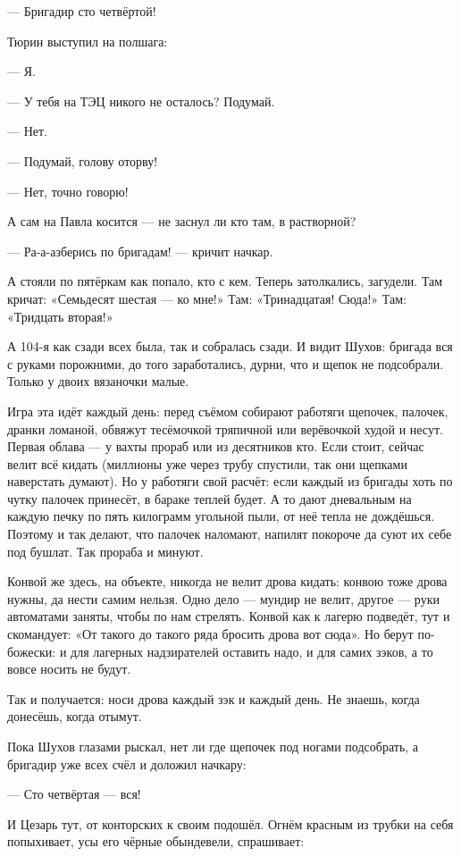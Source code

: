 --- Бригадир сто четвёртой!

Тюрин выступил на полшага:

--- Я.

--- У тебя на ТЭЦ никого не осталось? Подумай.

--- Нет.

--- Подумай, голову оторву!

--- Нет, точно говорю!

А сам на Павла косится --- не заснул ли кто там, в растворной?

--- Ра-а-азберись по бригадам! --- кричит начкар.

А стояли по пятёркам как попало, кто с кем. Теперь затолкались, загудели. Там кричат:
«Семьдесят шестая --- ко мне!» Там: «Тринадцатая! Сюда!» Там: «Тридцать вторая!»

А 104-я как сзади всех была, так и собралась сзади. И видит Шухов: бригада вся с руками
порожними, до того заработались, дурни, что и щепок не подсобрали. Только у двоих вязаночки
малые.

Игра эта идёт каждый день: перед съёмом собирают работяги щепочек, палочек, дранки ломаной,
обвяжут тесёмочкой тряпичной или верёвочкой худой и несут. Первая облава --- у вахты прораб
или из десятников кто. Если стоит, сейчас велит всё кидать (миллионы уже через трубу
спустили, так они щепками наверстать думают). Но у работяги свой расчёт: если каждый из
бригады хоть по чутку палочек принесёт, в бараке теплей будет. А то дают дневальным на каждую
печку по пять килограмм угольной пыли, от неё тепла не дождёшься. Поэтому и так делают, что
палочек наломают, напилят покороче да суют их себе под бушлат. Так прораба и минуют.

Конвой же здесь, на объекте, никогда не велит дрова кидать: конвою тоже дрова нужны, да нести
самим нельзя. Одно дело --- мундир не велит, другое --- руки автоматами заняты, чтобы по нам
стрелять. Конвой как к лагерю подведёт, тут и скомандует: «От такого до такого ряда бросить
дрова вот сюда». Но берут по-божески: и для лагерных надзирателей оставить надо, и для самих
зэков, а то вовсе носить не будут.

Так и получается: носи дрова каждый зэк и каждый день. Не знаешь, когда донесёшь, когда отымут.

Пока Шухов глазами рыскал, нет ли где щепочек под ногами подсобрать, а бригадир уже всех счёл
и доложил начкару:

--- Сто четвёртая --- вся!

И Цезарь тут, от конторских к своим подошёл. Огнём красным из трубки на себя попыхивает, усы
его чёрные обындевели, спрашивает:

